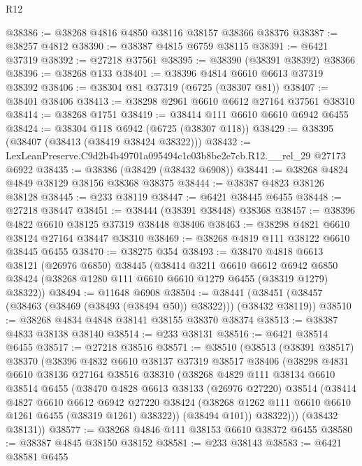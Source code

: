 \begin{lexlean}{R12}
\begin{coremodule}
@38386 := @38268 @4816 @4850 @38116 @38157 @38366 @38376
@38387 := @38257 @4812
@38390 := @38387 @4815 @6759 @38115
@38391 := @6421 @37319
@38392 := @27218 @37561
@38395 := @38390 (@38391 @38392) @38366
@38396 := @38268 @133
@38401 := @38396 @4814 @6610 @6613 @37319 @38392
@38406 := @38304 @81 @37319 (@6725 (@38307 @81))
@38407 := @38401 @38406
@38413 := @38298 @2961 @6610 @6612 @27164 @37561 @38310
@38414 := @38268 @1751
@38419 := @38414 @111 @6610 @6610 @6942 @6455
@38424 := @38304 @118 @6942 (@6725 (@38307 @118))
@38429 := @38395 (@38407 (@38413 (@38419 @38424 @38322)))
@38432 := LexLeanPreserve.C9d2b4b49701a095494c1c03b8be2e7cb.R12.__rel_29 @27173 @6922
@38435 := @38386 (@38429 (@38432 @6908))
@38441 := @38268 @4824 @4849 @38129 @38156 @38368 @38375
@38444 := @38387 @4823 @38126 @38128
@38445 := @233 @38119
@38447 := @6421 @38445 @6455
@38448 := @27218 @38447
@38451 := @38444 (@38391 @38448) @38368
@38457 := @38396 @4822 @6610 @38125 @37319 @38448 @38406
@38463 := @38298 @4821 @6610 @38124 @27164 @38447 @38310
@38469 := @38268 @4819 @111 @38122 @6610 @38445 @6455
@38470 := @38275 @354
@38493 := @38470
    @4818
    @6613
    @38121
    (@26976 @6850)
    @38445
    (@38414
      @3211
      @6610
      @6612
      @6942
      @6850
      @38424
      (@38268 @1280 @111 @6610 @6610 @1279 @6455 (@38319 @1279) @38322))
@38494 := @11648 @6908
@38504 := @38441 (@38451 (@38457 (@38463 (@38469 (@38493 (@38494 @50)) @38322))) (@38432 @38119))
@38510 := @38268 @4834 @4848 @38141 @38155 @38370 @38374
@38513 := @38387 @4833 @38138 @38140
@38514 := @233 @38131
@38516 := @6421 @38514 @6455
@38517 := @27218 @38516
@38571 := @38510
    (@38513
      (@38391 @38517)
      @38370
      (@38396
        @4832
        @6610
        @38137
        @37319
        @38517
        @38406
        (@38298
          @4831
          @6610
          @38136
          @27164
          @38516
          @38310
          (@38268
            @4829
            @111
            @38134
            @6610
            @38514
            @6455
            (@38470
              @4828
              @6613
              @38133
              (@26976 @27220)
              @38514
              (@38414
                @4827
                @6610
                @6612
                @6942
                @27220
                @38424
                (@38268 @1262 @111 @6610 @6610 @1261 @6455 (@38319 @1261) @38322))
              (@38494 @101))
            @38322)))
      (@38432 @38131))
@38577 := @38268 @4846 @111 @38153 @6610 @38372 @6455
@38580 := @38387 @4845 @38150 @38152
@38581 := @233 @38143
@38583 := @6421 @38581 @6455

\end{coremodule}
\end{lexlean}
